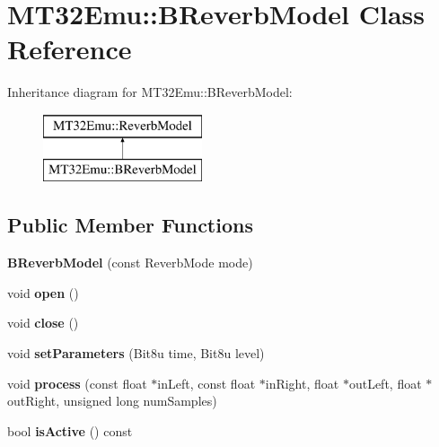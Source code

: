 \hypertarget{classMT32Emu_1_1BReverbModel}{\section{M\-T32\-Emu\-:\-:B\-Reverb\-Model Class Reference}
\label{classMT32Emu_1_1BReverbModel}
}
Inheritance diagram for M\-T32\-Emu\-:\-:B\-Reverb\-Model\-:\begin{figure}[H]
\begin{center}
\leavevmode
\includegraphics[height=2.000000cm]{classMT32Emu_1_1BReverbModel}
\end{center}
\end{figure}
\subsection*{Public Member Functions}
\begin{DoxyCompactItemize}
\item 
\hypertarget{classMT32Emu_1_1BReverbModel_a77a30b58bd0456a3ea2c268e8a07a8cd}{{\bfseries B\-Reverb\-Model} (const Reverb\-Mode mode)}\label{classMT32Emu_1_1BReverbModel_a77a30b58bd0456a3ea2c268e8a07a8cd}

\item 
\hypertarget{classMT32Emu_1_1BReverbModel_a5d223616b9927f46b1bbd34b75964c13}{void {\bfseries open} ()}\label{classMT32Emu_1_1BReverbModel_a5d223616b9927f46b1bbd34b75964c13}

\item 
\hypertarget{classMT32Emu_1_1BReverbModel_ab678b930206e8968a8ab1d36fb844f7e}{void {\bfseries close} ()}\label{classMT32Emu_1_1BReverbModel_ab678b930206e8968a8ab1d36fb844f7e}

\item 
\hypertarget{classMT32Emu_1_1BReverbModel_ab47b581462e43b3b2f45f30e7d7b86ca}{void {\bfseries set\-Parameters} (Bit8u time, Bit8u level)}\label{classMT32Emu_1_1BReverbModel_ab47b581462e43b3b2f45f30e7d7b86ca}

\item 
\hypertarget{classMT32Emu_1_1BReverbModel_a107f65efcfda9cb25dc71777914f32e5}{void {\bfseries process} (const float $\ast$in\-Left, const float $\ast$in\-Right, float $\ast$out\-Left, float $\ast$out\-Right, unsigned long num\-Samples)}\label{classMT32Emu_1_1BReverbModel_a107f65efcfda9cb25dc71777914f32e5}

\item 
\hypertarget{classMT32Emu_1_1BReverbModel_a4ff8c21629ea768b495c89b7e2a04996}{bool {\bfseries is\-Active} () const }\label{classMT32Emu_1_1BReverbModel_a4ff8c21629ea768b495c89b7e2a04996}

\end{DoxyCompactItemize}


